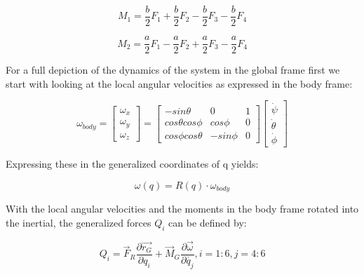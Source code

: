 \documentclass[10pt, letterpaper]{article}
\begin{document}
\[
M_{1}=\frac{b}{2}F_{1}+\frac{b}{2}F_{2}-\frac{b}{2}F_{3}-\frac{b}{2}F_{4}
\]

\[
M_{2}=\frac{a}{2}F_{1}-\frac{a}{2}F_{2}+\frac{a}{2}F_{3}-\frac{a}{2}F_{4}
\]

For a full depiction of the dynamics of the system in the global frame
first we start with looking at the local angular velocities as expressed
in the body frame:

\[
\omega_{body}=\left[\begin{array}{c}
\omega_{x}\\
\omega_{y}\\
\omega_{z}
\end{array}\right]=\left[\begin{array}{ccc}
-sin\theta & 0 & 1\\
cos\theta cos\phi & cos\phi & 0\\
cos\phi cos\theta & -sin\phi & 0
\end{array}\right]\left[\begin{array}{c}
\dot{\psi}\\
\dot{\theta}\\
\dot{\phi}
\end{array}\right]
\]

Expressing these in the generalized coordinates of q yields:

\[
\omega(q)=R(q)\cdot\omega_{body}
\]

With the local angular velocities and the moments in the body frame
rotated into the inertial, the generalized forces $Q_{i}$ can
be defined by:

\[
Q_{i}=\overrightarrow{F}_{R}\frac{\partial\overrightarrow{r_{G}}}{\partial q_{i}}+\overrightarrow{M}_{G}\frac{\partial\overrightarrow{\omega}}{\partial\dot{q_{j}}}, i=1:6, j=4:6
\]






\end{document}
